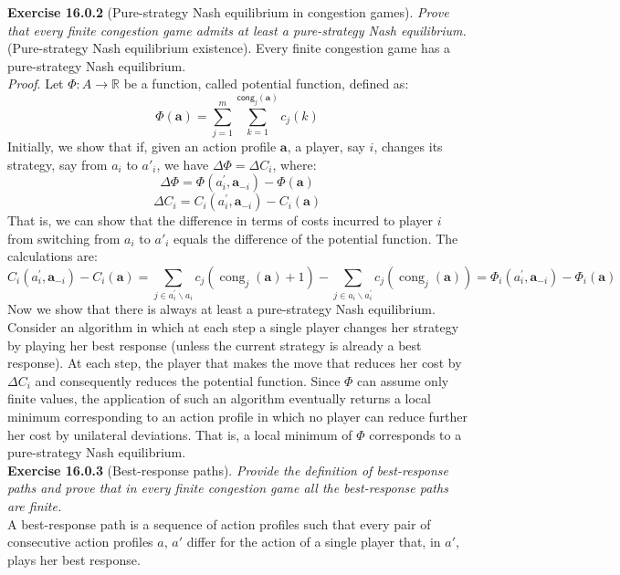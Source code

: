 \textbf{Exercise 16.0.2} (Pure-strategy Nash equilibrium in congestion games). \textit{Prove that every finite congestion game admits at least a pure-strategy Nash equilibrium.}\\
(Pure-strategy Nash equilibrium existence). Every finite congestion game has a pure-strategy Nash equilibrium.\\
\textit{Proof}. Let $\Phi : A \rightarrow \mathbb{R}$ be a function, called potential function, defined as:
$$\Phi(\mathbf{a}) = \sum_{j=1}^{m} \sum_{k=1}^{\textsf{cong}_j (\mathbf{a})} c_j (k)$$
Initially, we show that if, given an action profile $\mathbf{a}$, a player, say $i$, changes its strategy, say from $a_i$ to $a'_i$, we have $\Delta \Phi = \Delta C_i$, where:
$$\Delta \Phi =\Phi\left(a_{i}^{\prime}, \mathbf{a}_{-i}\right)-\Phi(\mathbf{a})$$
$$\Delta C_{i} =C_{i}\left(a_{i}^{\prime}, \mathbf{a}_{-i}\right)-C_{i}(\mathbf{a})$$
That is, we can show that the difference in terms of costs incurred to player $i$ from switching from $a_i$ to $a'_i$ equals the difference of the potential function. The calculations are:
$$C_{i}\left(a_{i}^{\prime}, \mathbf{a}_{-i}\right) -C_{i}(\mathbf{a})=\sum_{j \in a_{i}^{\prime} \backslash a_{i}} c_{j}\left(\operatorname{cong}_{j}(\mathbf{a})+1\right) - \sum_{j \in a_{i} \backslash a_{i}^{\prime}} c_{j}\left(\operatorname{cong}_{j}(\mathbf{a})\right)=\Phi_{i}\left(a_{i}^{\prime}, \mathbf{a}_{-i}\right)-\Phi_{i}(\mathbf{a})$$
Now we show that there is always at least a pure-strategy Nash equilibrium. Consider an algorithm in which at each step a single player changes her strategy by playing her best response (unless the current strategy is already a best response). At each step, the player that makes the move that reduces her cost by $\Delta C_i$ and consequently reduces the potential function. Since $\Phi$ can assume only finite values, the application of such an algorithm eventually returns a local minimum corresponding to an action profile in which no player can reduce further her cost by unilateral deviations. That is, a local minimum of $\Phi$ corresponds to a pure-strategy Nash equilibrium.\\

\textbf{Exercise 16.0.3} (Best-response paths). \textit{Provide the definition of best-response paths and prove that in every finite congestion game all the best-response paths are finite.}\\

A best-response path is a sequence of action profiles such that every pair of consecutive action profiles $a$, $a'$ differ for the action of a single player that, in $a'$, plays her best response.\\

